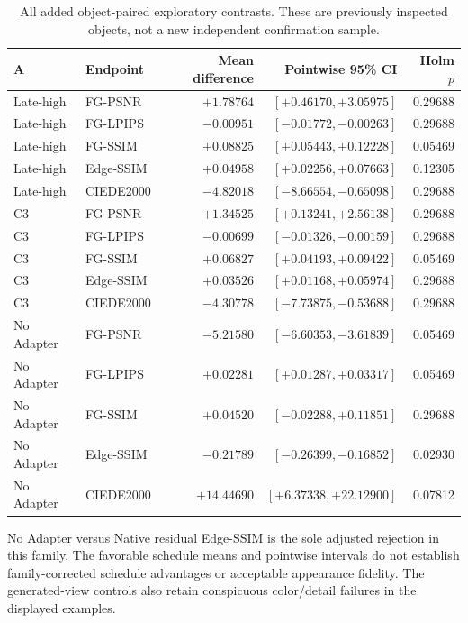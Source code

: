 \documentclass[11pt]{article}
\begin{document}
\begin{table}[htbp]\centering\scriptsize
\begin{tabular}{llrrr}\toprule A & Endpoint & Mean difference & Pointwise 95\% CI & Holm $p$\\\midrule
Late-high & FG-PSNR & $+1.78764$ & $[+0.46170,+3.05975]$ & 0.29688 \\
Late-high & FG-LPIPS & $-0.00951$ & $[-0.01772,-0.00263]$ & 0.29688 \\
Late-high & FG-SSIM & $+0.08825$ & $[+0.05443,+0.12228]$ & 0.05469 \\
Late-high & Edge-SSIM & $+0.04958$ & $[+0.02256,+0.07663]$ & 0.12305 \\
Late-high & CIEDE2000 & $-4.82018$ & $[-8.66554,-0.65098]$ & 0.29688 \\
C3 & FG-PSNR & $+1.34525$ & $[+0.13241,+2.56138]$ & 0.29688 \\
C3 & FG-LPIPS & $-0.00699$ & $[-0.01326,-0.00159]$ & 0.29688 \\
C3 & FG-SSIM & $+0.06827$ & $[+0.04193,+0.09422]$ & 0.05469 \\
C3 & Edge-SSIM & $+0.03526$ & $[+0.01168,+0.05974]$ & 0.29688 \\
C3 & CIEDE2000 & $-4.30778$ & $[-7.73875,-0.53688]$ & 0.29688 \\
No Adapter & FG-PSNR & $-5.21580$ & $[-6.60353,-3.61839]$ & 0.05469 \\
No Adapter & FG-LPIPS & $+0.02281$ & $[+0.01287,+0.03317]$ & 0.05469 \\
No Adapter & FG-SSIM & $+0.04520$ & $[-0.02288,+0.11851]$ & 0.29688 \\
No Adapter & Edge-SSIM & $-0.21789$ & $[-0.26399,-0.16852]$ & 0.02930 \\
No Adapter & CIEDE2000 & $+14.44690$ & $[+6.37338,+22.12900]$ & 0.07812 \\
\bottomrule\end{tabular}
\caption{All added object-paired exploratory contrasts. These are previously inspected objects, not a new independent confirmation sample.}\end{table}
No Adapter versus Native residual Edge-SSIM is the sole adjusted rejection in this family. The favorable schedule means and pointwise intervals do not establish family-corrected schedule advantages or acceptable appearance fidelity. The generated-view controls also retain conspicuous color/detail failures in the displayed examples.
\end{document}
